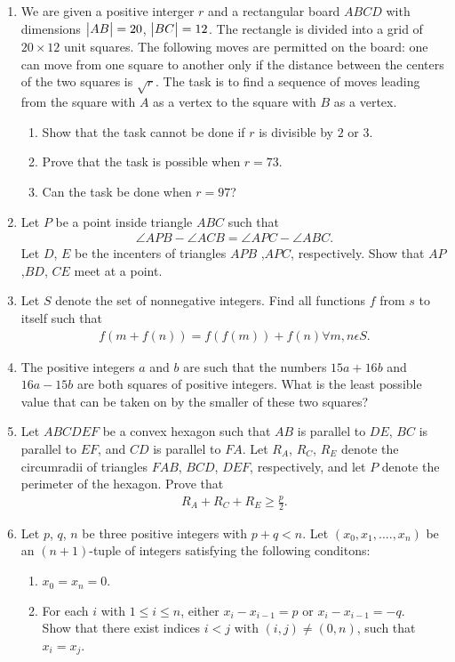 \documentclass{article}
\begin{document}
\begin{enumerate}
\item  We are given a positive interger $r$ and a rectangular board $ABCD$ with dimensions $\begin{vmatrix}AB\end{vmatrix} =20$, $\begin{vmatrix}BC\end{vmatrix}=12$. The rectangle is divided into a grid of $20\times12$ unit squares. The following moves are permitted on the board: one can move from one square to another only if the distance between the centers of the two squares is $\sqrt{r}$. The task is to find a sequence of moves leading from the square with $A$ as a vertex to the square with $B$ as a vertex.
\begin{enumerate}
\item Show that the task cannot be done if $r$ is divisible by $2$ or $3$.
\item Prove that the task is possible when $r=73$.
\item Can the task be done when $r=97$?
\end{enumerate}
\item Let $P$ be a point inside triangle $ABC$ such that
\begin{align*}
\angle{APB}-\angle{ACB}=\angle{APC}-\angle{ABC}.
\end{align*}
Let $D$, $E$ be the incenters of triangles $APB$ ,$APC$, respectively. Show that $AP$ ,$BD$, $CE$ meet at a point.
\item Let $S$ denote the set of nonnegative integers. Find all functions $f$ from $s$ to itself such that 
\begin{align*}
f(m+f(n))=f(f(m))+f(n)         
\forall{m}, n \epsilon S. 
\end{align*}
\item The positive integers $a$ and $b$ are such that the numbers $15a+16b$ and $16a-15b$ are both squares of positive integers. What is the least possible value that can be taken on by the smaller of these two squares?
\item Let $ABCDEF$ be a convex hexagon such that $AB$ is parallel to $DE$, $BC$ is parallel to $EF$, and $CD$ is parallel to $FA$. Let $R_A$, $R_C$, $R_E$ denote the circumradii of triangles $FAB$, $BCD$, $DEF$, respectively, and let $P$ denote the perimeter of the hexagon. Prove that
\begin{align*}
R_A+R_C+R_E\geq\frac{p}{2}.
\end{align*}
\item Let $p$, $q$, $n$ be three positive integers with $p+q<n$. Let $(x_0, x_1,....,x_n)$ be an $(n+1)$-tuple of integers satisfying the following conditons:
\begin{enumerate}
\item $x_0=x_n=0$.
\item For each $i$ with $1\leq{i}\leq{n}$, either $x_i-x_{i-1}=p$ or $x_i-x_{i-1}=-q$.\\ 
Show that there exist indices $i < j$ with $(i,j) \neq(0,n)$, such that $x_i=x_j$.
\end{enumerate}
\end{enumerate}
\end{document}
